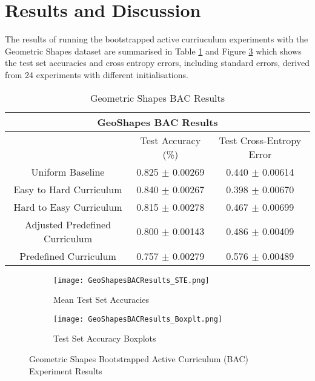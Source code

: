 \section{Results and Discussion}\label{sec:BAC_Results}
The results of running the bootstrapped active curriuculum experiments with the Geometric Shapes dataset are summarised in Table \ref{tab:GeoShapes BACResults} and Figure \ref{fig:GeoShapesBACResults} which shows the test set accuracies and cross entropy errors, including standard errors, derived from 24 experiments with different initialisations.
\begin{table}[h]
\caption{Geometric Shapes BAC Results} \label{tab:GeoShapes BACResults}
\begin{tabular}{|c||c|c|}
\hline
\multicolumn{3}{|c|}{GeoShapes BAC Results} \\
\hline
 & Test Accuracy (\%) & Test Cross-Entropy Error \\
\hline
Uniform Baseline&  0.825 $\pm$ 0.00269 & 0.440 $\pm$ 0.00614 \\
\hline
Easy to Hard Curriculum & 0.840 $\pm$ 0.00267 & 0.398 $\pm$ 0.00670 \\
\hline
Hard to Easy Curriculum &  0.815 $\pm$ 0.00278 & 0.467 $\pm$ 0.00699 \\
\hline
Adjusted Predefined Curriculum & 0.800 $\pm$ 0.00143 & 0.486 $\pm$ 0.00409 \\
\hline
Predefined Curriculum & 0.757 $\pm$ 0.00279 & 0.576 $\pm$ 0.00489 \\
\hline
\end{tabular}
\end{table}
\begin{figure}[h]
\hspace*{-3cm}    
\centering
\begin{subfigure}{0.7\textwidth}
  \centering
  \texttt{[image: GeoShapesBACResults\_STE.png]}
  \caption{ Mean Test Set Accuracies}
  \label{fig:BAC_StE}
\end{subfigure}%
\begin{subfigure}{0.7\textwidth}
\hspace*{-1cm}   
  \centering
  \texttt{[image: GeoShapesBACResults\_Boxplt.png]}
  \caption{Test Set Accuracy Boxplots}
  \label{fig:BAC_Boxplt}
\end{subfigure}
\caption{Geometric Shapes Bootstrapped Active Curriculum (BAC) Experiment Results}
\label{fig:GeoShapesBACResults}
\end{figure}

